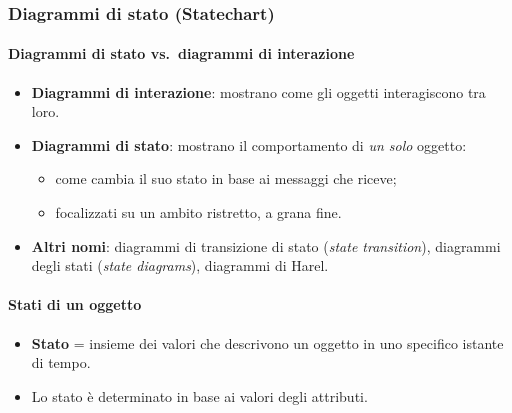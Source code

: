 \documentclass[a4paper,12pt]{article}
\begin{document}
\subsubsection{Diagrammi di stato (Statechart)}
\paragraph{Diagrammi di stato vs.\ diagrammi di interazione}
\begin{itemize}
  \item \textbf{Diagrammi di interazione}: mostrano come gli oggetti interagiscono tra
        loro.
  \item \textbf{Diagrammi di stato}: mostrano il comportamento di \emph{un solo}
        oggetto:
  \begin{itemize}
    \item come cambia il suo stato in base ai messaggi che riceve;
    \item focalizzati su un ambito ristretto, a grana fine.
  \end{itemize}
  \item \textbf{Altri nomi}: diagrammi di transizione di stato (\emph{state
        transition}), diagrammi degli stati (\emph{state diagrams}), diagrammi di Harel.
\end{itemize}

\paragraph{Stati di un oggetto}
\begin{itemize}
  \item \textbf{Stato} = insieme dei valori che descrivono un oggetto in uno specifico
        istante di tempo.
  \item Lo stato è determinato in base ai valori degli attributi.
\end{itemize}
\begin{center}
\end{center}
\end{document}
